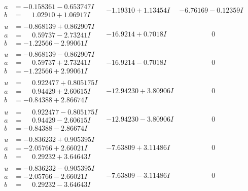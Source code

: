 \documentclass[1p]{elsarticle_modified}
\theoremstyle{definition}
\begin{document}
$$\begin{array}{c|c|c}
\begin{aligned}
a &= -0.158361 - 0.653747 I \\
b &= \phantom{-}1.02910 + 1.06917 I\end{aligned}
 & -1.19310 + 1.13454 I & -6.76169 - 0.12359 I \\ \hline\begin{aligned}
u &= -0.868139 + 0.862907 I \\
a &= \phantom{-}0.59737 - 2.73241 I \\
b &= -1.22566 - 2.99061 I\end{aligned}
 & -16.9214 + 0.7018 I & \phantom{-0.000000 } 0 \\ \hline\begin{aligned}
u &= -0.868139 - 0.862907 I \\
a &= \phantom{-}0.59737 + 2.73241 I \\
b &= -1.22566 + 2.99061 I\end{aligned}
 & -16.9214 - 0.7018 I & \phantom{-0.000000 } 0 \\ \hline\begin{aligned}
u &= \phantom{-}0.922477 + 0.805175 I \\
a &= \phantom{-}0.94429 + 2.60615 I \\
b &= -0.84388 + 2.86674 I\end{aligned}
 & -12.94230 + 3.80906 I & \phantom{-0.000000 } 0 \\ \hline\begin{aligned}
u &= \phantom{-}0.922477 - 0.805175 I \\
a &= \phantom{-}0.94429 - 2.60615 I \\
b &= -0.84388 - 2.86674 I\end{aligned}
 & -12.94230 - 3.80906 I & \phantom{-0.000000 } 0 \\ \hline\begin{aligned}
u &= -0.836232 + 0.905395 I \\
a &= -2.05766 + 2.66021 I \\
b &= \phantom{-}0.29232 + 3.64643 I\end{aligned}
 & -7.63809 + 3.11486 I & \phantom{-0.000000 } 0 \\ \hline\begin{aligned}
u &= -0.836232 - 0.905395 I \\
a &= -2.05766 - 2.66021 I \\
b &= \phantom{-}0.29232 - 3.64643 I\end{aligned}
 & -7.63809 - 3.11486 I & \phantom{-0.000000 } 0 \\ \hline\begin{aligned}

\end{aligned}
\end{array}$$
\end{document}
